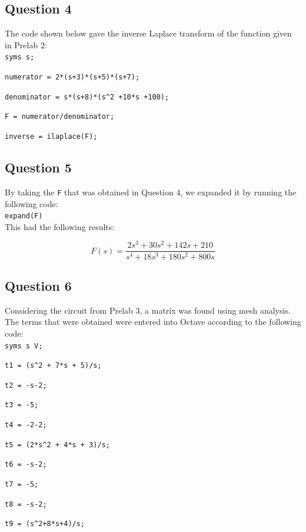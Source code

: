 \documentclass[12pt, a4paper]{article}
\begin{document}
	\subsection{Question 4}
	The code shown below gave the inverse Laplace transform of the function given in Prelab 2:\\

	\texttt{syms s;}\par
  	\texttt{numerator = 2*(s+3)*(s+5)*(s+7);}\par
  	\texttt{denominator = s*(s+8)*(s\^{}2 +10*s +100);}\par
  	\texttt{F = numerator/denominator;}\par
  	\texttt{inverse = ilaplace(F);}\\

	\subsection{Question 5}
	By taking the \texttt{F} that was obtained in Question 4, we expanded it by running the following code:\\

	\texttt{expand(F)}\\

	\noindent This had the following results:

	\[
		F(s) = \frac{2s^3 + 30s^2 + 142s + 210}{s^4 + 18s^3 + 180s^2 + 800s}
	\]


	\subsection{Question 6}
	Considering the circuit from Prelab 3, a matrix was found using mesh analysis. The terms that were obtained were entered into Octave according to the following code:\\

	\texttt{syms s V;} \par
	\texttt{t1 = (s\^{}2 + 7*s + 5)/s;}\par
	\texttt{t2 = -s-2;}\par
	\texttt{t3 = -5;}\par
	\texttt{t4 = -2-2;}\par
	\texttt{t5 = (2*s\^{}2 + 4*s + 3)/s;}\par
	\texttt{t6 = -s-2;}\par
	\texttt{t7 = -5;}\par
	\texttt{t8 = -s-2;}\par
	\texttt{t9 = (s\^{}2+8*s+4)/s;}\\
\end{document}
